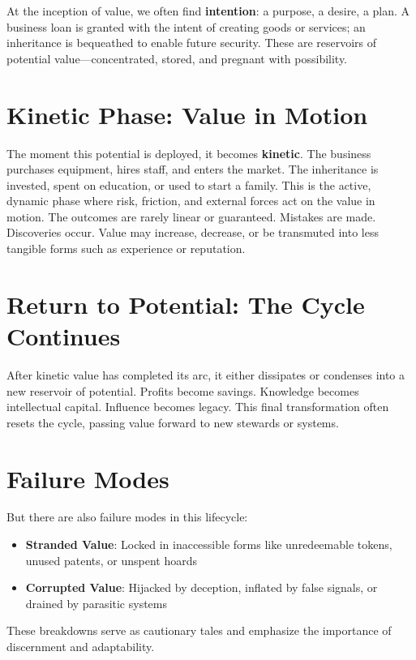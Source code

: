 \documentclass[11pt,oneside]{book}
\begin{document}
At the inception of value, we often find \textbf{intention}: a purpose, a desire, a plan. A business loan is granted with the intent of creating goods or services; an inheritance is bequeathed to enable future security. These are reservoirs of potential value—concentrated, stored, and pregnant with possibility.

\section{Kinetic Phase: Value in Motion}

The moment this potential is deployed, it becomes \textbf{kinetic}. The business purchases equipment, hires staff, and enters the market. The inheritance is invested, spent on education, or used to start a family. This is the active, dynamic phase where risk, friction, and external forces act on the value in motion. The outcomes are rarely linear or guaranteed. Mistakes are made. Discoveries occur. Value may increase, decrease, or be transmuted into less tangible forms such as experience or reputation.

\section{Return to Potential: The Cycle Continues}

After kinetic value has completed its arc, it either dissipates or condenses into a new reservoir of potential. Profits become savings. Knowledge becomes intellectual capital. Influence becomes legacy. This final transformation often resets the cycle, passing value forward to new stewards or systems.

\section{Failure Modes}

But there are also failure modes in this lifecycle:

\begin{itemize}
\item \textbf{Stranded Value}: Locked in inaccessible forms like unredeemable tokens, unused patents, or unspent hoards
\item \textbf{Corrupted Value}: Hijacked by deception, inflated by false signals, or drained by parasitic systems
\end{itemize}

These breakdowns serve as cautionary tales and emphasize the importance of discernment and adaptability.
\end{document}
